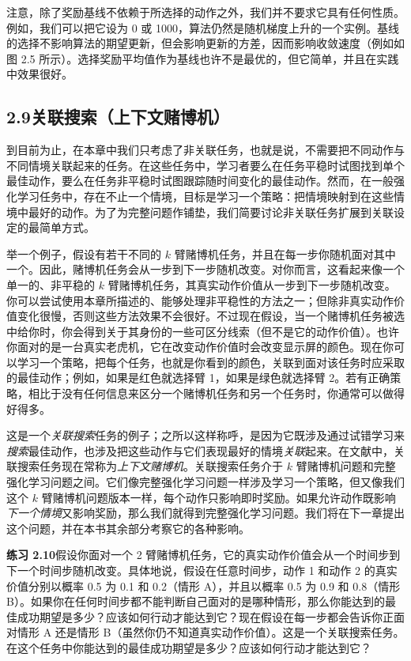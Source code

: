 \documentclass[UTF8, 12pt, fontset=fandol, oneside]{ctexart}
\begin{document}
注意，除了奖励基线不依赖于所选择的动作之外，我们并不要求它具有任何性质。例如，我们可以把它设为 0 或 1000，算法仍然是随机梯度上升的一个实例。基线的选择不影响算法的期望更新，但会影响更新的方差，因而影响收敛速度（例如如图 2.5 所示）。选择奖励平均值作为基线也许不是最优的，但它简单，并且在实践中效果很好。

\subsection*{2.9\quad 关联搜索（上下文赌博机）}

到目前为止，在本章中我们只考虑了非关联任务，也就是说，不需要把不同动作与不同情境关联起来的任务。在这些任务中，学习者要么在任务平稳时试图找到单个最佳动作，要么在任务非平稳时试图跟踪随时间变化的最佳动作。然而，在一般强化学习任务中，存在不止一个情境，目标是学习一个策略：把情境映射到在这些情境中最好的动作。为了为完整问题作铺垫，我们简要讨论非关联任务扩展到关联设定的最简单方式。

举一个例子，假设有若干不同的 $k$ 臂赌博机任务，并且在每一步你随机面对其中一个。因此，赌博机任务会从一步到下一步随机改变。对你而言，这看起来像一个单一的、非平稳的 $k$ 臂赌博机任务，其真实动作价值从一步到下一步随机改变。你可以尝试使用本章所描述的、能够处理非平稳性的方法之一；但除非真实动作价值变化很慢，否则这些方法效果不会很好。不过现在假设，当一个赌博机任务被选中给你时，你会得到关于其身份的一些可区分线索（但不是它的动作价值）。也许你面对的是一台真实老虎机，它在改变动作价值时会改变显示屏的颜色。现在你可以学习一个策略，把每个任务，也就是你看到的颜色，关联到面对该任务时应采取的最佳动作；例如，如果是红色就选择臂 1，如果是绿色就选择臂 2。若有正确策略，相比于没有任何信息来区分一个赌博机任务和另一个任务时，你通常可以做得好得多。

这是一个\emph{关联搜索}任务的例子；之所以这样称呼，是因为它既涉及通过试错学习来\emph{搜索}最佳动作，也涉及把这些动作与它们表现最好的情境\emph{关联}起来。在文献中，关联搜索任务现在常称为\emph{上下文赌博机}。关联搜索任务介于 $k$ 臂赌博机问题和完整强化学习问题之间。它们像完整强化学习问题一样涉及学习一个策略，但又像我们这个 $k$ 臂赌博机问题版本一样，每个动作只影响即时奖励。如果允许动作既影响\emph{下一个情境}又影响奖励，那么我们就得到完整强化学习问题。我们将在下一章提出这个问题，并在本书其余部分考察它的各种影响。

\noindent\textbf{练习 2.10}\quad 假设你面对一个 2 臂赌博机任务，它的真实动作价值会从一个时间步到下一个时间步随机改变。具体地说，假设在任意时间步，动作 1 和动作 2 的真实价值分别以概率 0.5 为 0.1 和 0.2（情形 A），并且以概率 0.5 为 0.9 和 0.8（情形 B）。如果你在任何时间步都不能判断自己面对的是哪种情形，那么你能达到的最佳成功期望是多少？应该如何行动才能达到它？现在假设在每一步都会告诉你正面对情形 A 还是情形 B（虽然你仍不知道真实动作价值）。这是一个关联搜索任务。在这个任务中你能达到的最佳成功期望是多少？应该如何行动才能达到它？
\end{document}

